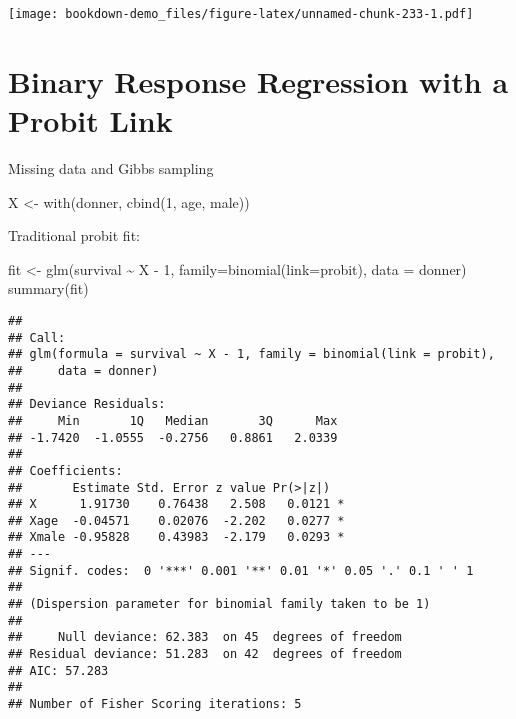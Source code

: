 \documentclass[
]{book}
\newenvironment{Shaded}{\begin{snugshade}}{\end{snugshade}}
\newcommand{\AttributeTok}[1]{\textcolor[rgb]{0.77,0.63,0.00}{#1}}
\newcommand{\DecValTok}[1]{\textcolor[rgb]{0.00,0.00,0.81}{#1}}
\newcommand{\FunctionTok}[1]{\textcolor[rgb]{0.00,0.00,0.00}{#1}}
\newcommand{\NormalTok}[1]{#1}
\newcommand{\OtherTok}[1]{\textcolor[rgb]{0.56,0.35,0.01}{#1}}
\newcommand{\SpecialCharTok}[1]{\textcolor[rgb]{0.00,0.00,0.00}{#1}}
\begin{document}
\texttt{[image: bookdown-demo\_files/figure-latex/unnamed-chunk-233-1.pdf]}

\hypertarget{binary-response-regression-with-a-probit-link}{%
\section{Binary Response Regression with a Probit Link}\label{binary-response-regression-with-a-probit-link}}

Missing data and Gibbs sampling

\begin{Shaded}
\begin{Highlighting}[]
\NormalTok{X }\OtherTok{\textless{}{-}} \FunctionTok{with}\NormalTok{(donner,}
          \FunctionTok{cbind}\NormalTok{(}\DecValTok{1}\NormalTok{, age, male))}
\end{Highlighting}
\end{Shaded}

Traditional probit fit:

\begin{Shaded}
\begin{Highlighting}[]
\NormalTok{fit }\OtherTok{\textless{}{-}} \FunctionTok{glm}\NormalTok{(survival }\SpecialCharTok{\textasciitilde{}}\NormalTok{ X }\SpecialCharTok{{-}} \DecValTok{1}\NormalTok{,}
           \AttributeTok{family=}\FunctionTok{binomial}\NormalTok{(}\AttributeTok{link=}\NormalTok{probit),}
           \AttributeTok{data =}\NormalTok{ donner)}
\FunctionTok{summary}\NormalTok{(fit)}
\end{Highlighting}
\end{Shaded}

\begin{verbatim}
## 
## Call:
## glm(formula = survival ~ X - 1, family = binomial(link = probit), 
##     data = donner)
## 
## Deviance Residuals: 
##     Min       1Q   Median       3Q      Max  
## -1.7420  -1.0555  -0.2756   0.8861   2.0339  
## 
## Coefficients:
##       Estimate Std. Error z value Pr(>|z|)  
## X      1.91730    0.76438   2.508   0.0121 *
## Xage  -0.04571    0.02076  -2.202   0.0277 *
## Xmale -0.95828    0.43983  -2.179   0.0293 *
## ---
## Signif. codes:  0 '***' 0.001 '**' 0.01 '*' 0.05 '.' 0.1 ' ' 1
## 
## (Dispersion parameter for binomial family taken to be 1)
## 
##     Null deviance: 62.383  on 45  degrees of freedom
## Residual deviance: 51.283  on 42  degrees of freedom
## AIC: 57.283
## 
## Number of Fisher Scoring iterations: 5
\end{verbatim}
\end{document}
